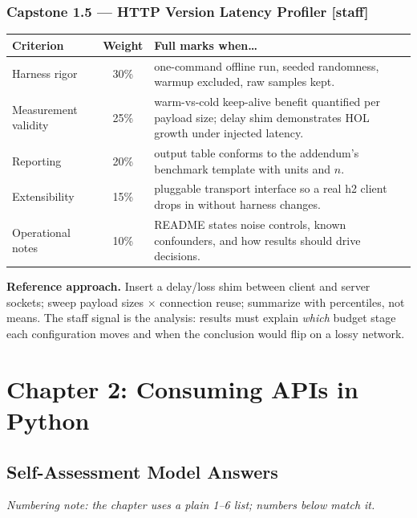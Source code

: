 \subsubsection*{Capstone 1.5 --- HTTP Version Latency Profiler [staff]}
\begin{center}\small
\begin{tabularx}{\textwidth}{l c X}
\toprule
\textbf{Criterion} & \textbf{Weight} & \textbf{Full marks when\ldots} \\
\midrule
Harness rigor & 30\% & one-command offline run, seeded randomness, warmup excluded, raw samples kept. \\
Measurement validity & 25\% & warm-vs-cold keep-alive benefit quantified per payload size; delay shim demonstrates HOL growth under injected latency. \\
Reporting & 20\% & output table conforms to the addendum's benchmark template with units and $n$. \\
Extensibility & 15\% & pluggable transport interface so a real h2 client drops in without harness changes. \\
Operational notes & 10\% & README states noise controls, known confounders, and how results should drive decisions. \\
\bottomrule
\end{tabularx}
\end{center}
\textbf{Reference approach.} Insert a delay/loss shim between client and
server sockets; sweep payload sizes $\times$ connection reuse; summarize
with percentiles, not means. The staff signal is the analysis: results must
explain \emph{which} budget stage each configuration moves and when the
conclusion would flip on a lossy network.

\section{Chapter 2: Consuming APIs in Python}
\label{sec:sol-ch2}

\subsection{Self-Assessment Model Answers}

\emph{Numbering note: the chapter uses a plain 1--6 list; numbers below
match it.}

